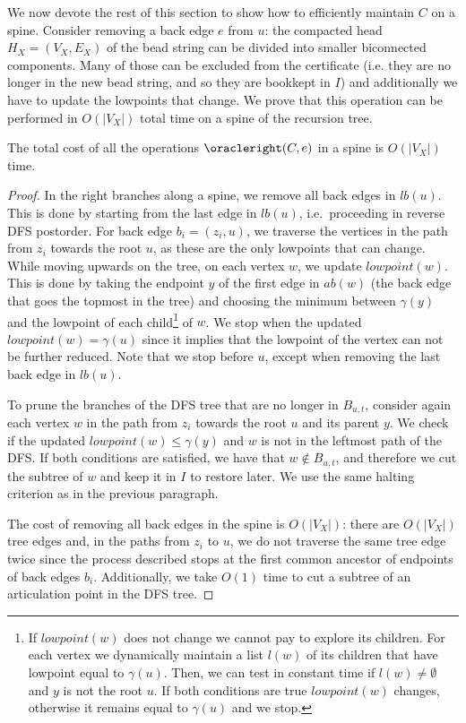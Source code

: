 We now devote the rest of this section to show how to efficiently
maintain $C$ on a spine.  Consider removing a back edge $e$ from $u$:
the compacted head $H_X=(V_X,E_X)$ of the bead string can be divided
into smaller biconnected components.  Many of those can be excluded
from the certificate (i.e. they are no longer in the new bead string,
and so they are bookkept in $I$) and additionally we have to update
the lowpoints that change. We prove that this operation can be
performed in $O(|V_X|)$ total time on a spine of the recursion tree.

\begin{lemma}
	\label{lem:removebackedge}
	The total cost of all the operations $\oracleright(C,e)$ in a
        spine is $O(|V_X|)$ time.
\end{lemma}
\begin{proof}
	In the right branches along a spine, we remove all back edges
        in $lb(u)$. This is done by starting from the last edge in
        $lb(u)$, i.e.~proceeding in reverse DFS postorder.
For back edge $b_i = (z_i,u)$, we traverse the vertices in the
	path from $z_i$ towards the root $u$, as these are the only lowpoints
	that can change.
While moving upwards on the tree, on each vertex $w$, we
        update $\mathit{lowpoint}(w)$. This is done by taking the
        endpoint $y$ of the first edge in $ab(w)$ (the back edge that
        goes the topmost in the tree) and choosing the minimum between
        $\gamma(y)$ and the lowpoint of each child\footnote{If
          $\mathit{lowpoint}(w)$ does not change we cannot pay to
          explore its children. For each vertex we dynamically
          maintain a list $l(w)$ of its children that have lowpoint
          equal to $\gamma(u)$. Then, we can test in constant time if
          $l(w) \neq \emptyset$ and $y$ is not the root $u$. If both
          conditions are true $\mathit{lowpoint}(w)$ changes,
          otherwise it remains equal to $\gamma(u)$ and we stop.} of
        $w$. We stop when the updated $\mathit{lowpoint}(w) =
        \gamma(u)$ since it implies that the lowpoint of the vertex
        can not be further reduced.  Note that we stop before $u$,
        except when removing the last back edge in $lb(u)$.

	To prune the branches of the DFS tree that are no longer in
        $B_{u,t}$, consider again each vertex $w$ in the path from
        $z_i$ towards the root $u$ and its parent $y$. We check if the
        updated $\mathit{lowpoint}(w) \leq \gamma(y)$ and $w$ is not
        in the leftmost path of the DFS. If both conditions are
        satisfied, we have that $w \notin B_{u,t}$, and therefore we
        cut the subtree of $w$ and keep it in $I$ to restore later. We
        use the same halting criterion as in the previous paragraph.
	
	The cost of removing all back edges in the spine is
	$O(|V_X|)$: there are $O(|V_X|)$ tree edges and, in the paths
	from $z_i$ to $u$, we do not traverse the same tree edge twice
	since the process described stops at the first common ancestor
	of endpoints of back edges $b_i$. Additionally, we take $O(1)$
	time to cut a subtree of an articulation point in the DFS tree. 
\end{proof}


